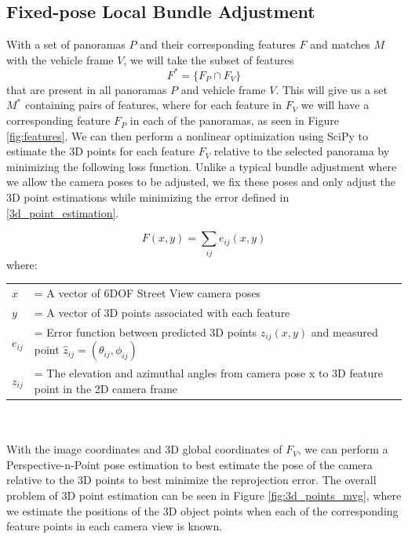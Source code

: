 \documentclass[conference]{IEEEtran}
\begin{document}
\subsection{Fixed-pose Local Bundle Adjustment}

With a set of panoramas  $P$ and their corresponding features $F$ and matches $M$ with the vehicle frame $V$, we will take the subset of features $$ F^* = \{F_P \cap F_V\} $$ that are present in all panoramas $P$ and vehicle frame $V$. This will give us a set $M^*$ containing pairs of features, where for each feature in $F_V$ we will have a corresponding feature $F_P$ in each of the panoramas, as seen in Figure \ref{fig:features}. We can then perform a nonlinear optimization using SciPy to estimate the 3D points for each feature $F_V$ relative to the selected panorama by minimizing the following loss function. Unlike a typical bundle adjustment where we allow the camera poses to be adjusted, we fix these poses and only adjust the 3D point estimations while minimizing the error defined in \eqref{3d_point_estimation}.

\begin{equation}
F(x,y)=\sum_{ij} e_{ij}(x,y)
\label{3d_point_estimation}
\end{equation}
where: \\
\begin{tabularx}{\linewidth}{lX}
$x$ &= A vector of 6DOF Street View camera poses\\
$y$ &= A vector of 3D points associated with each feature\\
$e_{ij}$ &= Error function between predicted 3D points $z_{ij}(x,y)$ and measured point $\hat{z}_{ij}=(\theta_{ij}, \phi_{ij})$\\
$z_{ij}$ &= The elevation and azimuthal angles from camera pose x to 3D feature point in the 2D camera frame\\
\end{tabularx}
\\\\

With the image coordinates and 3D global coordinates of $F_V$, we can perform a Perspective-n-Point pose estimation to best estimate the pose of the camera relative to the 3D points to best minimize the reprojection error. The overall problem of 3D point estimation can be seen in Figure \ref{fig:3d_points_mvg}, where we estimate the positions of the 3D object points when each of the corresponding feature points in each camera view is known.
\end{document}
